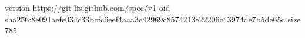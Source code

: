 version https://git-lfs.github.com/spec/v1
oid sha256:8e091aefe034c33bcfc6eef4aaa3e42969c8574213e22206c43974de7b5de65c
size 785
